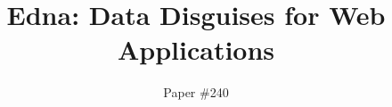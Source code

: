 \documentclass[letterpaper,twocolumn,10pt]{article}
\newcommand{\sys}{Edna\xspace}
\begin{document}

\date{}

\title{\Large \bf \sys: Data Disguises for Web Applications
}


\author{
{Paper \#240}\\
} %

\maketitle







%
%
%






\printbibliography

\end{document}
